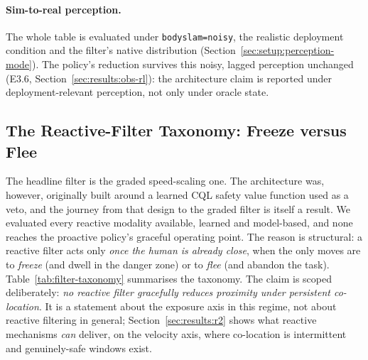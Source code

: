 \documentclass[11pt,a4paper]{report}
\begin{document}
\paragraph{Sim-to-real perception.}
The whole table is evaluated under \texttt{bodyslam=noisy}, the
realistic deployment condition and the filter's native distribution
(Section~\ref{sec:setup:perception-mode}). The policy's reduction
survives this noisy, lagged perception unchanged (E3.6,
Section~\ref{sec:results:obs-rl}): the architecture claim is reported
under deployment-relevant perception, not only under oracle state.

\subsection{The Reactive-Filter Taxonomy: Freeze versus Flee}
\label{sec:results:reactive-taxonomy}

The headline filter is the graded speed-scaling one. The architecture
was, however, originally built around a learned \textsc{CQL} safety
value function used as a veto, and the journey from that design to the
graded filter is itself a result. We evaluated every reactive modality
available, learned and model-based, and none reaches the proactive
policy's graceful operating point. The reason is structural: a reactive
filter acts only \emph{once the human is already close}, when the only
moves are to \emph{freeze} (and dwell in the danger zone) or to
\emph{flee} (and abandon the task). Table~\ref{tab:filter-taxonomy}
summarises the taxonomy. The claim is
scoped deliberately: \emph{no reactive filter gracefully reduces
proximity under persistent co-location}. It is a statement about the
exposure axis in this regime, not about reactive filtering in
general; Section~\ref{sec:results:r2} shows what reactive mechanisms
\emph{can} deliver, on the velocity axis, where co-location is
intermittent and genuinely-safe windows exist.
\end{document}
